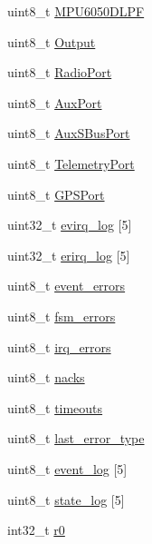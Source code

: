 \begin{DoxyCompactItemize}
uint8\-\_\-t \hyperlink{struct____attribute_____a24dc4a300602ff8d9b4dba0548820650}{\-M\-P\-U6050\-D\-L\-P\-F}
\item 
uint8\-\_\-t \hyperlink{struct____attribute_____a9b550253a1fe2025d54d2ef5f7efcbca}{\-Output}
\item 
uint8\-\_\-t \hyperlink{struct____attribute_____a26d6cfd3082838b681d85f58eacfe535}{\-Radio\-Port}
\item 
uint8\-\_\-t \hyperlink{struct____attribute_____a04aa2f525d11dfa7be84d46ff76e34de}{\-Aux\-Port}
\item 
uint8\-\_\-t \hyperlink{struct____attribute_____a85fd3a2c998f370d514da1fe0a606505}{\-Aux\-S\-Bus\-Port}
\item 
uint8\-\_\-t \hyperlink{struct____attribute_____ad54e844e59df26c723ec926a434a0e6f}{\-Telemetry\-Port}
\item 
uint8\-\_\-t \hyperlink{struct____attribute_____a08e5752671d28c93ff42e5560676b210}{\-G\-P\-S\-Port}
\item 
uint32\-\_\-t \hyperlink{struct____attribute_____a9d30c7564162ad5f30ac0dd4678a3050}{evirq\-\_\-log} \mbox{[}5\mbox{]}
\item 
uint32\-\_\-t \hyperlink{struct____attribute_____a398dadb88f40da0483b9ea312d58a414}{erirq\-\_\-log} \mbox{[}5\mbox{]}
\item 
uint8\-\_\-t \hyperlink{struct____attribute_____a9d500731e164fbe1281f2e21ecac4e58}{event\-\_\-errors}
\item 
uint8\-\_\-t \hyperlink{struct____attribute_____a3e28c40cf08f379fab9e5fead85aef68}{fsm\-\_\-errors}
\item 
uint8\-\_\-t \hyperlink{struct____attribute_____a802f451ff215b7db49584ae0db52dd80}{irq\-\_\-errors}
\item 
uint8\-\_\-t \hyperlink{struct____attribute_____ad6e6261c47652a449e1d302153be77c9}{nacks}
\item 
uint8\-\_\-t \hyperlink{struct____attribute_____ad79d9d78415e451903a0e941fa8ae309}{timeouts}
\item 
uint8\-\_\-t \hyperlink{struct____attribute_____a7b0de2ce3a07a118427206ffbcfa624f}{last\-\_\-error\-\_\-type}
\item 
uint8\-\_\-t \hyperlink{struct____attribute_____aecc83d112889a512cfc70fe4693cf168}{event\-\_\-log} \mbox{[}5\mbox{]}
\item 
uint8\-\_\-t \hyperlink{struct____attribute_____a6ecf528c777ae35d5a0585474e809fb1}{state\-\_\-log} \mbox{[}5\mbox{]}
\item 
int32\-\_\-t \hyperlink{struct____attribute_____a925baf38083c726d669304ea67c36074}{r0}

\end{DoxyCompactItemize}
